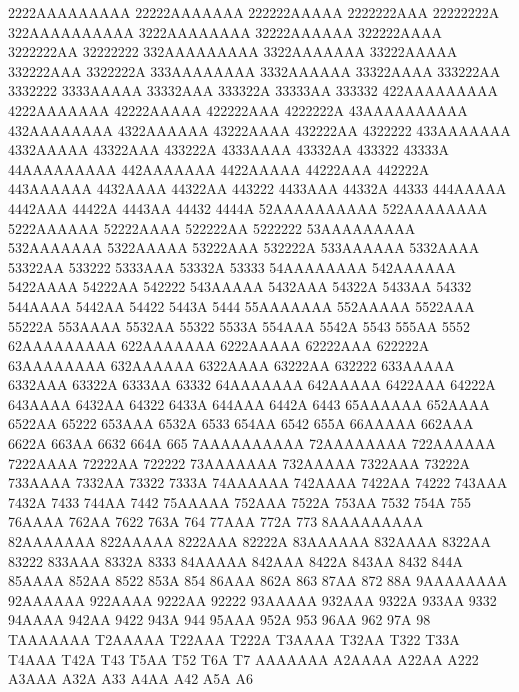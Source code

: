 \tiny
2222AAAAAAAAA 22222AAAAAAA 222222AAAAA 2222222AAA 22222222A 322AAAAAAAAAA 
3222AAAAAAAA 32222AAAAAA 322222AAAA 3222222AA 32222222 332AAAAAAAAA 
3322AAAAAAA 33222AAAAA 332222AAA 3322222A 333AAAAAAAA 3332AAAAAA 
33322AAAA 333222AA 3332222 3333AAAAA 33332AAA 333322A 
33333AA 333332 422AAAAAAAAA 4222AAAAAAA 42222AAAAA 422222AAA 
4222222A 43AAAAAAAAAA 432AAAAAAAA 4322AAAAAA 43222AAAA 432222AA 
4322222 433AAAAAAA 4332AAAAA 43322AAA 433222A 4333AAAA 
43332AA 433322 43333A 44AAAAAAAAA 442AAAAAAA 4422AAAAA 
44222AAA 442222A 443AAAAAA 4432AAAA 44322AA 443222 
4433AAA 44332A 44333 444AAAAA 4442AAA 44422A 
4443AA 44432 4444A 52AAAAAAAAAA 522AAAAAAAA 5222AAAAAA 
52222AAAA 522222AA 5222222 53AAAAAAAAA 532AAAAAAA 5322AAAAA 
53222AAA 532222A 533AAAAAA 5332AAAA 53322AA 533222 
5333AAA 53332A 53333 54AAAAAAAA 542AAAAAA 5422AAAA 
54222AA 542222 543AAAAA 5432AAA 54322A 5433AA 
54332 544AAAA 5442AA 54422 5443A 5444 
55AAAAAAA 552AAAAA 5522AAA 55222A 553AAAA 5532AA 
55322 5533A 554AAA 5542A 5543 555AA 
5552 62AAAAAAAAA 622AAAAAAA 6222AAAAA 62222AAA 622222A 
63AAAAAAAA 632AAAAAA 6322AAAA 63222AA 632222 633AAAAA 
6332AAA 63322A 6333AA 63332 64AAAAAAA 642AAAAA 
6422AAA 64222A 643AAAA 6432AA 64322 6433A 
644AAA 6442A 6443 65AAAAAA 652AAAA 6522AA 
65222 653AAA 6532A 6533 654AA 6542 
655A 66AAAAA 662AAA 6622A 663AA 6632 
664A 665 7AAAAAAAAAA 72AAAAAAAA 722AAAAAA 7222AAAA 
72222AA 722222 73AAAAAAA 732AAAAA 7322AAA 73222A 
733AAAA 7332AA 73322 7333A 74AAAAAA 742AAAA 
7422AA 74222 743AAA 7432A 7433 744AA 
7442 75AAAAA 752AAA 7522A 753AA 7532 
754A 755 76AAAA 762AA 7622 763A 
764 77AAA 772A 773 8AAAAAAAAA 82AAAAAAA 
822AAAAA 8222AAA 82222A 83AAAAAA 832AAAA 8322AA 
83222 833AAA 8332A 8333 84AAAAA 842AAA 
8422A 843AA 8432 844A 85AAAA 852AA 
8522 853A 854 86AAA 862A 863 
87AA 872 88A 9AAAAAAAA 92AAAAAA 922AAAA 
9222AA 92222 93AAAAA 932AAA 9322A 933AA 
9332 94AAAA 942AA 9422 943A 944 
95AAA 952A 953 96AA 962 97A 
98 TAAAAAAA T2AAAAA T22AAA T222A T3AAAA 
T32AA T322 T33A T4AAA T42A T43 
T5AA T52 T6A T7 AAAAAAA A2AAAA 
A22AA A222 A3AAA A32A A33 A4AA 
A42 A5A A6
